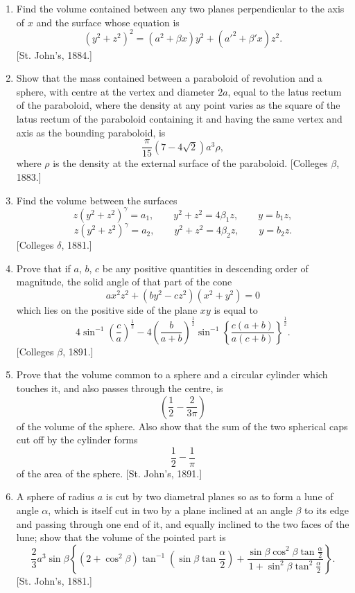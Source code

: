 \documentclass[11pt, a4paper]{article}
\newcommand{\source}[1]{\hfill\textnormal{[#1]}}
\begin{document}
\begin{enumerate}[leftmargin=2em]
Examine what happens in the case of a regular tetrahedron.

\item[29.] Find the volume contained between any two planes perpendicular to the axis of $x$ and the surface whose equation is
\[
(y^2+z^2)^2=(a^2+\beta x)y^2+(a'^2+\beta'x)z^2.
\]
\source{St. John's, 1884.}

\item[30.] Show that the mass contained between a paraboloid of revolution and a sphere, with centre at the vertex and diameter $2a$, equal to the latus rectum of the paraboloid, where the density at any point varies as the square of the latus rectum of the paraboloid containing it and having the same vertex and axis as the bounding paraboloid, is
\[
\frac{\pi}{15}(7-4\sqrt2)a^3\rho,
\]
where $\rho$ is the density at the external surface of the paraboloid.
\source{Colleges $\beta$, 1883.}

\item[31.] Find the volume between the surfaces
\[
z(y^2+z^2)^\gamma=a_1,\qquad
y^2+z^2=4\beta_1z,\qquad
y=b_1z,
\]
\[
z(y^2+z^2)^\gamma=a_2,\qquad
y^2+z^2=4\beta_2z,\qquad
y=b_2z.
\]
\source{Colleges $\delta$, 1881.}

\item[32.] Prove that if $a$, $b$, $c$ be any positive quantities in descending order of magnitude, the solid angle of that part of the cone
\[
ax^2z^2+(by^2-cz^2)(x^2+y^2)=0
\]
which lies on the positive side of the plane $xy$ is equal to
\[
4\sin^{-1}\left(\frac{c}{a}\right)^{\frac12}
-
4\left(\frac{b}{a+b}\right)^{\frac12}
\sin^{-1}
\left\{
\frac{c(a+b)}{a(c+b)}
\right\}^{\frac12}.
\]
\source{Colleges $\beta$, 1891.}

\item[33.] Prove that the volume common to a sphere and a circular cylinder which touches it, and also passes through the centre, is
\[
\left(\frac12-\frac{2}{3\pi}\right)
\]
of the volume of the sphere.
Also show that the sum of the two spherical caps cut off by the cylinder forms
\[
\frac12-\frac{1}{\pi}
\]
of the area of the sphere.
\source{St. John's, 1891.}

\item[34.] A sphere of radius $a$ is cut by two diametral planes so as to form a lune of angle $\alpha$, which is itself cut in two by a plane inclined at an angle $\beta$ to its edge and passing through one end of it, and equally inclined to the two faces of the lune; show that the volume of the pointed part is
\[
\frac{2}{3}a^3\sin\beta
\left\{
(2+\cos^2\beta)\tan^{-1}\left(\sin\beta\tan\frac{\alpha}{2}\right)
+
\frac{\sin\beta\cos^2\beta\tan\frac{\alpha}{2}}
{1+\sin^2\beta\tan^2\frac{\alpha}{2}}
\right\}.
\]
\source{St. John's, 1881.}


\end{enumerate}
\end{document}
